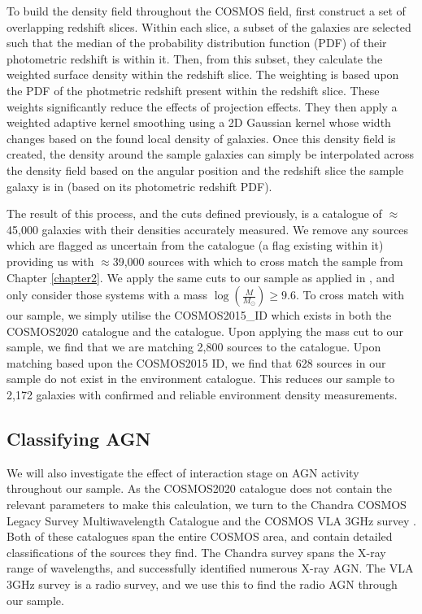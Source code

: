 To build the density field throughout the COSMOS field, \citet{2017ApJ...837...16D} first construct a set of overlapping redshift slices. Within each slice, a subset of the galaxies are selected such that the median of the probability distribution function (PDF) of their photometric redshift is within it. Then, from this subset, they calculate the weighted surface density within the redshift slice. The weighting is based upon the PDF of the photmetric redshift present within the redshift slice. These weights significantly reduce the effects of projection effects. They then apply a weighted adaptive kernel smoothing using a 2D Gaussian kernel whose width changes based on the found local density of galaxies. Once this density field is created, the density around the sample galaxies can simply be interpolated across the density field based on the angular position and the redshift slice the sample galaxy is in (based on its photometric redshift PDF).

The result of this process, and the cuts defined previously, is a catalogue of $\approx$45,000 galaxies with their densities accurately measured. We remove any sources which are flagged as uncertain from the catalogue (a flag existing within it) providing us with $\approx$39,000 sources with which to cross match the sample from Chapter \ref{chapter2}. We apply the same cuts to our sample as applied in \citet{2017ApJ...837...16D}, and only consider those systems with a mass $\log(\frac{M}{M_\odot}) \geq 9.6$. To cross match with our sample, we simply utilise the COSMOS2015\_ID which exists in both the COSMOS2020 catalogue and the \citet{2017ApJ...837...16D} catalogue. Upon applying the mass cut to our sample, we find that we are matching 2,800 sources to the \citet{2017ApJ...837...16D} catalogue. Upon matching based upon the COSMOS2015 ID, we find that 628 sources in our sample do not exist in the environment catalogue. This reduces our sample to 2,172 galaxies with confirmed and reliable environment density measurements.

\subsection{Classifying AGN}\label{sec:agn-clsf}
\noindent We will also investigate the effect of interaction stage on AGN activity throughout our sample. As the COSMOS2020 catalogue does not contain the relevant parameters to make this calculation, we turn to the Chandra COSMOS Legacy Survey Multiwavelength Catalogue \citep{2016ApJ...817...34M} and the COSMOS VLA 3GHz survey \citep{2017A&A...602A...6S, 2017A&A...602A...3D}. Both of these catalogues span the entire COSMOS area, and contain detailed classifications of the sources they find. The Chandra survey spans the X-ray range of wavelengths, and successfully identified numerous X-ray AGN. The VLA 3GHz survey is a radio survey, and we use this to find the radio AGN through our sample. 

